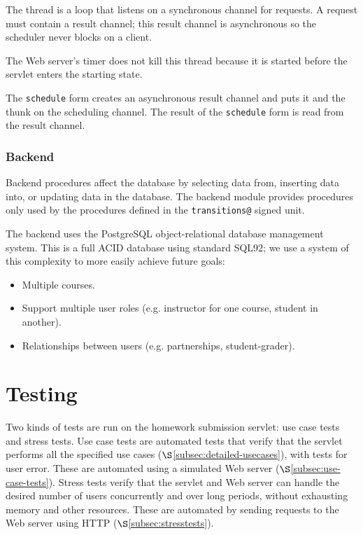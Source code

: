 \documentclass[a4paper]{article}
\begin{document}
The thread is a loop that listens on a synchronous channel for requests. A
request must contain a result channel; this result channel is asynchronous so
the scheduler never blocks on a client.

The Web server's timer does not kill this thread because it is started before
the servlet enters the starting state. 

The \verb|schedule| form creates an asynchronous result channel and puts it and
the thunk on the scheduling channel. The result of the \verb|schedule| form is
read from the result channel.


\subsubsection{Backend}\label{subsubsec:backend}

Backend procedures affect the database by selecting data from, inserting data
into, or updating data in the database. The backend module provides procedures
only used by the procedures defined in the \verb|transitions@| signed unit.

The backend uses the PostgreSQL object-relational database management system.
This is a full ACID database using standard SQL92; we use a system of this
complexity to more easily achieve future goals:

\begin{itemize}
\item{Multiple courses.}
\item{Support multiple user roles (e.g. instructor for one course, student in
another).}
\item{Relationships between users (e.g. partnerships, student-grader).}
\end{itemize}

\section{Testing}\label{sec:tests}

Two kinds of tests are run on the homework submission servlet: use case tests
and stress tests. Use case tests are automated tests that verify that the
servlet performs all the specified use cases
($\S$\ref{subsec:detailed-usecases}), with tests for user error. These are
automated using a simulated Web server ($\S$\ref{subsec:use-case-tests}).
Stress tests verify that the servlet and Web server can handle the desired
number of users concurrently and over long periods, without exhausting memory
and other resources.  These are automated by sending requests to the Web server
using HTTP ($\S$\ref{subsec:stresstests}).
\end{document}

